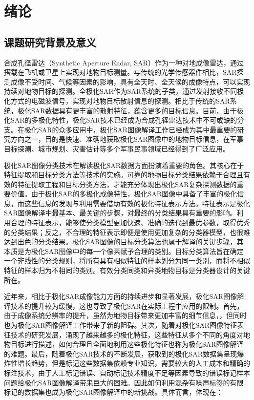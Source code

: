 \chapter{绪\hspace{6pt}论}

\section{课题研究背景及意义}
合成孔径雷达（Synthetic Aperture Radar, SAR）作为一种对地成像雷达，通过搭载在飞机或卫星上实现对地物目标测量。与传统的光学传感器件相比，SAR探测成像不受时间、气候等因素的影响，具有全天时、全天候的成像特点，可以实现持续对地物目标的探测。全极化SAR作为SAR系统的子类，通过发射接收不同极化方式的电磁波信号，实现对地物目标散射信息的探测。相比于传统的SAR系统，极化SAR数据具有更丰富的散射特征，蕴含更多的目标信息。目前，由于极化SAR的多极化特性，极化SAR技术已经成为合成孔径雷达技术中不可或缺的分支。在极化SAR的众多应用中，极化SAR图像解译工作已经成为其中最重要的研究方向之一，目的是快速、准确地获取极化SAR图像中的地物目标信息，在军事目标探测、城市规划、灾害估计等多个军事民事领域已经得到了广泛应用。

极化SAR图像分类技术在解读极化SAR数据方面扮演着重要的角色。其核心在于特征提取和目标分类方法等技术的实施。可靠的地物目标分类结果依赖于合理且有效的特征提取工程和目标分类方法，才能充分体现出极化SAR复杂探测数据的重要价值。由于极化SAR的多极化成像特性，极化SAR图像中具备了丰富的极化信息，而这些信息的发现与利用需要借助有效的极化特征表示方法。特征表示是极化SAR图像解译中最基本、最关键的步骤，对最终的分类结果具有重要的影响。利用合理的特征表示，能够使分类模型更加快速、准确的迭代到最优参数，取得优秀的分类结果；反之，不合理的特征表示即便是使用更加复杂的分类器模型，也很难达到出色的分类结果。极化SAR图像的目标分类算法也属于解译的关键步骤，其本质是为极化SAR图像中的每一个像素赋予合理的类别。目标分类算法旨在确定一个非线性的分类规则，将所有具有相似特征的样本划分为同一类别，而将不相似特征的样本归为不相同的类别。有效分类同类和异类地物目标是分类器设计的关键所在。

近年来，相比于极化SAR成像能力方面的持续进步和显著发展，极化SAR图像解译技术的提升较为缓慢，这也导致了极化SAR在实际工程中应用的限制。首先，由于成像系统分辨率的提升，虽然为地物目标带来更加丰富的细节信息，，但同时也为极化SAR图像解译工作带来了新的阻碍。其次，随着对极化SAR图像特征表征技术的研究发展，涌现了越来越多的极化特征，这些特征从多个不同的角度对地物目标进行描述，如何合理且全面地利用这些极化特征也称为极化SAR图像解译的难题。最后，随着极化SAR技术的不断发展，获取到的极化SAR数据集呈现爆炸性增长趋势，但是标记这些数据集依赖专业知识，需要较大的人工成本和精确的标注技术，由于人工标记错误、自动标记技术精度不足等因素导致的错误标记样本问题给极化SAR图像解译带来巨大的困难。因此如何利用混杂有噪声标签的有限标记的数据集也成为极化SAR图像解译中的新挑战。具体而言，体现在：

